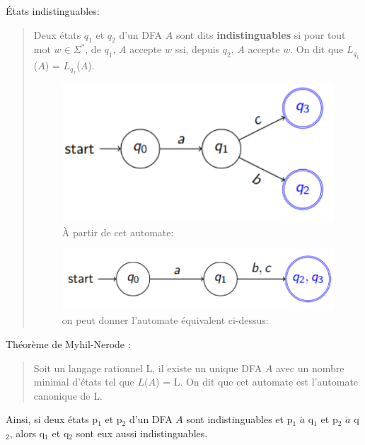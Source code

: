 \documentclass{article}
\begin{document}
États indistinguables:
\begin{quote}
    Deux états $q_{1}$ et $q_{2}$ d'un DFA $A$ sont dits \textbf{indistinguables} si pour tout mot $w \in \Sigma^{*}$, de $q_{1}$, $A$ accepte $w$ ssi, depuis $q_{2}$, $A$ accepte $w$. On dit que $L_{q_{1}}$($A$) = $L_{q_{2}}$($A$).
    
    \begin{figure}[h]
        \centering
        \includegraphics[scale=0.3]{Image15.png}
        \caption{À partir de cet automate:}
    \end{figure}
    
    \begin{figure}[h]
        \centering
        \includegraphics[scale=0.3]{Image16.png}
        \caption{on peut donner l'automate équivalent ci-dessus:}
    \end{figure}
\end{quote}
Théorème de Myhil-Nerode :
\begin{quote}
    Soit un langage rationnel L, il existe un unique DFA $A$ avec un nombre minimal d'états tel que $L$($A$) = L. On dit que cet automate est l'automate canonique de L.
\end{quote}

Ainsi, si deux états p$_{1}$ et p$_{2}$ d'un DFA $A$ sont indistinguables et p$_{1}$ $\underrightarrow{a}$ q$_{1}$ et p$_{2}$ $\underrightarrow{a}$ q$_{2}$, alors q$_{1}$ et q$_{2}$ sont eux aussi indistinguables.
\end{document}
